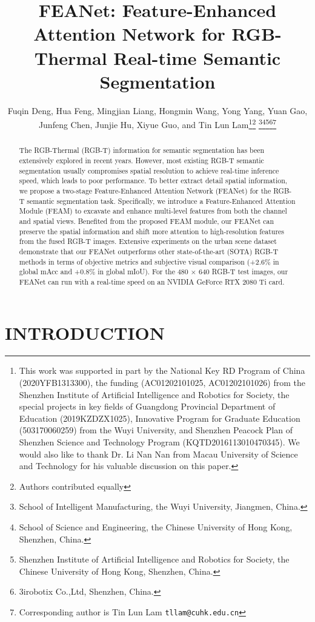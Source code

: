 \documentclass[letterpaper, 10 pt, conference]{ieeeconf}  \usepackage{graphicx}
\title{\LARGE \bf
FEANet: Feature-Enhanced Attention Network for RGB-Thermal Real-time Semantic Segmentation
}
\author{Fuqin Deng, Hua Feng, Mingjian Liang, Hongmin Wang, Yong Yang, Yuan Gao, \\Junfeng Chen, Junjie Hu, Xiyue Guo, and Tin Lun Lam\thanks{This work was supported in part by the National Key RD Program of China (2020YFB1313300), the funding (AC01202101025, AC01202101026) from the Shenzhen Institute of Artificial Intelligence and Robotics for Society, the special projects in key fields of Guangdong Provincial Department of Education (2019KZDZX1025), Innovative Program for Graduate Education (503170060259) from the Wuyi University, and Shenzhen Peacock Plan of Shenzhen Science and Technology Program (KQTD2016113010470345).
We would also like to thank Dr. Li Nan Nan from Macau University of Science and Technology for his valuable discussion on this paper.}\thanks{Authors contributed equally}
\thanks{School of Intelligent Manufacturing, the Wuyi University, Jiangmen, China.
        }\thanks{School of Science and Engineering, the Chinese University of Hong Kong, Shenzhen, China.
        }\thanks{Shenzhen Institute of Artificial Intelligence and Robotics for Society, the Chinese University of Hong Kong, Shenzhen, China.
        }\thanks{3irobotix Co.,Ltd, Shenzhen, China.
        }\thanks{Corresponding author is Tin Lun Lam
        {\tt\small tllam@cuhk.edu.cn}
        }}
\begin{document}
\maketitle
\thispagestyle{empty}
\pagestyle{empty}

\begin{abstract}

The RGB-Thermal (RGB-T) information for semantic segmentation has been extensively explored in recent years. However, most existing RGB-T semantic segmentation usually compromises spatial resolution to achieve real-time inference speed, which leads to poor performance. To better extract detail spatial information, we propose a two-stage Feature-Enhanced Attention Network (FEANet) for the RGB-T semantic segmentation task. Specifically, we introduce a Feature-Enhanced Attention Module (FEAM) to excavate and enhance multi-level features from both the channel and spatial views. Benefited from the proposed FEAM module, our FEANet can preserve the spatial information and shift more attention to high-resolution features from the fused RGB-T images. Extensive experiments on the urban scene dataset demonstrate that our FEANet outperforms other state-of-the-art (SOTA) RGB-T methods in terms of objective metrics and subjective visual comparison (+2.6\% in global mAcc and +0.8\% in global mIoU). For the 480 × 640 RGB-T test images, our FEANet can run with a real-time speed on an NVIDIA GeForce RTX 2080 Ti card.

\end{abstract}

\section{INTRODUCTION}
\end{document}
